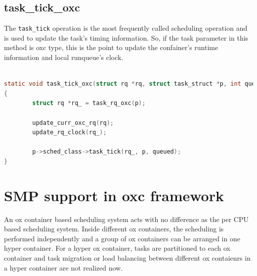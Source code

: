 \subsection{task\_tick\_oxc }
The \texttt{task\_tick} operation is the most frequently called scheduling 
operation and is used to update the task's timing information. So, if
the task parameter in this method is oxc type, this is the point to
update the confainer's runtime information and local runqueue's clock.
\begin{lstlisting}[language=C, label={list:task_tick},
		caption={The most frequent called entry to update a container's runtime}]
			
static void task_tick_oxc(struct rq *rq, struct task_struct *p, int queued)
{
        struct rq *rq_ = task_rq_oxc(p);

        update_curr_oxc_rq(rq);
        update_rq_clock(rq_);

        p->sched_class->task_tick(rq_, p, queued);
}
\end{lstlisting}

\section{SMP support in oxc framework}
An ox container based scheduling system acts with no difference as the 
per CPU based scheduling system. Inside different ox containers, 
the scheduling is performed independently and a group of ox containers
can be arranged in one hyper container. For a hyper ox container, tasks are
partitioned to each ox container and task migration or load balancing between 
different ox contaienrs in a hyper container are not realized now.

